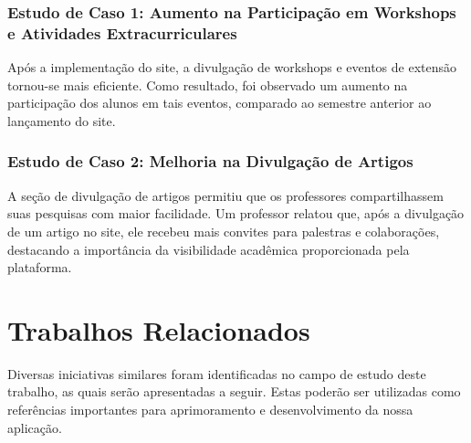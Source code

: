 \documentclass[a4paper,12pt]{report}
\begin{document}
\subsection{Estudo de Caso 1: Aumento na Participação em Workshops e Atividades Extracurriculares}
Após a implementação do site, a divulgação de workshops e eventos de extensão tornou-se mais eficiente. Como resultado, foi observado um aumento na participação dos alunos em tais eventos, comparado ao semestre anterior ao lançamento do site.

\subsection{Estudo de Caso 2: Melhoria na Divulgação de Artigos}
A seção de divulgação de artigos permitiu que os professores compartilhassem suas pesquisas com maior facilidade. Um professor relatou que, após a divulgação de um artigo no site, ele recebeu mais convites para palestras e colaborações, destacando a importância da visibilidade acadêmica proporcionada pela plataforma.

\chapter{Trabalhos Relacionados}
Diversas iniciativas similares foram identificadas no campo de estudo deste trabalho, as quais serão apresentadas a seguir. Estas poderão ser utilizadas como referências importantes para aprimoramento e desenvolvimento da nossa aplicação.\
\end{document}
